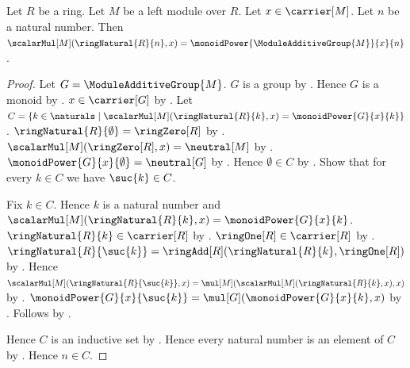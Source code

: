\begin{theorem}\label{module_natural_scalar}
    Let $R$ be a ring.
    Let $M$ be a left module over $R$.
    Let $x\in\carrier[M]$.
    Let $n$ be a natural number.
    Then
        $\scalarMul[M](\ringNatural{R}{n},x)
            =\monoidPower{\ModuleAdditiveGroup{M}}{x}{n}$.
\end{theorem}
\begin{proof}
    Let $G=\ModuleAdditiveGroup{M}$.
    $G$ is a group by .
    Hence $G$ is a monoid by .
    $x\in\carrier[G]$ by .
    Let $C=\{k\in\naturals\mid
        \text{$\scalarMul[M](\ringNatural{R}{k},x)
            =\monoidPower{G}{x}{k}$}\}$.
    $\ringNatural{R}{\emptyset}=\ringZero[R]$ by
        .
    $\scalarMul[M](\ringZero[R],x)=\neutral[M]$ by
        .
    $\monoidPower{G}{x}{\emptyset}=\neutral[G]$ by
        .
    Hence $\emptyset\in C$ by
        .
    Show that for every $k\in C$ we have $\suc{k}\in C$.
    \begin{subproof}
        Fix $k\in C$.
        Hence $k$ is a natural number and
            $\scalarMul[M](\ringNatural{R}{k},x)
                =\monoidPower{G}{x}{k}$.
        $\ringNatural{R}{k}\in\carrier[R]$ by
            .
        $\ringOne[R]\in\carrier[R]$ by .
        $\ringNatural{R}{\suc{k}}
            =\ringAdd[R](\ringNatural{R}{k},\ringOne[R])$ by
            .
        Hence
            $\scalarMul[M](\ringNatural{R}{\suc{k}},x)
                =\mul[M](\scalarMul[M](\ringNatural{R}{k},x),x)$ by
            .
        $\monoidPower{G}{x}{\suc{k}}
            =\mul[G](\monoidPower{G}{x}{k},x)$ by
            .
        Follows by
            .
    \end{subproof}
    Hence $C$ is an inductive set by .
    Hence every natural number is an element of $C$ by
        .
    Hence $n\in C$.
\end{proof}

